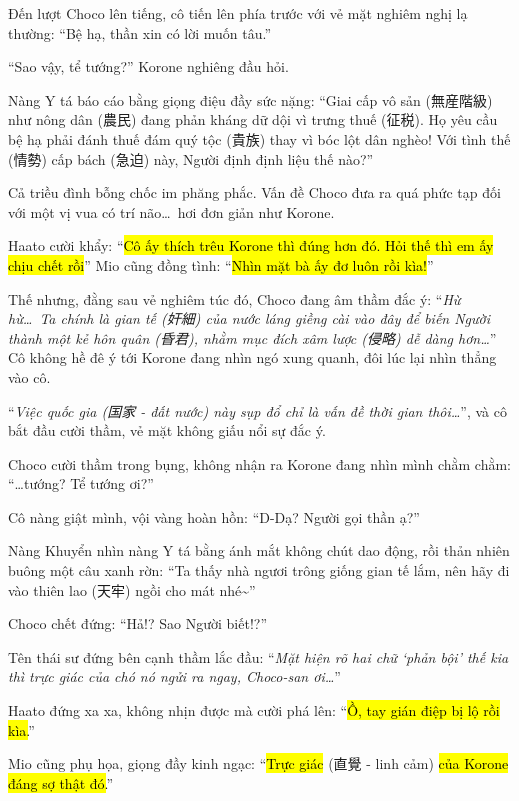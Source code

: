 \documentclass[../main.tex]{subfiles}
\begin{document}
Đến lượt Choco lên tiếng, cô tiến lên phía trước với vẻ mặt nghiêm nghị lạ thường: ``Bệ hạ, thần xin có lời muốn tâu.''

``Sao vậy, tể tướng?'' Korone nghiêng đầu hỏi.

Nàng Y tá báo cáo bằng giọng điệu đầy sức nặng: ``Giai cấp vô sản (無産階級) như nông dân (農民) đang phản kháng dữ dội vì trưng thuế (征税). Họ yêu cầu bệ hạ phải đánh thuế đám quý tộc (貴族) thay vì bóc lột dân nghèo! Với tình thế (情勢) cấp bách (急迫) này, Người định định liệu thế nào?''

Cả triều đình bỗng chốc im phăng phắc. Vấn đề Choco đưa ra quá phức tạp đối với một vị vua có trí não\dots\ hơi đơn giản như Korone.


Haato cười khẩy: ``\hl{Cô ấy thích trêu Korone thì đúng hơn đó. Hỏi thế thì em ấy chịu chết rồi}'' Mio cũng đồng tình: ``\hl{Nhìn mặt bà ấy đơ luôn rồi kìa!}''

Thế nhưng, đằng sau vẻ nghiêm túc đó, Choco đang âm thầm đắc ý: ``\textit{Hừ hừ\dots\ Ta chính là gian tế (奸細) của nước láng giềng cài vào đây để biến Người thành một kẻ hôn quân (昏君), nhằm mục đích xâm lược (侵略) dễ dàng hơn\dots}'' Cô không hề đê ý tới Korone đang nhìn ngó xung quanh, đôi lúc lại nhìn thẳng vào cô.

``\textit{Việc quốc gia (国家 - đất nước) này sụp đổ chỉ là vấn đề thời gian thôi\dots}'', và cô bắt đầu cười thầm, vẻ mặt không giấu nổi sự đắc ý.

Choco cười thầm trong bụng, không nhận ra Korone đang nhìn mình chằm chằm: ``\dots tướng? Tể tướng ơi?''

Cô nàng giật mình, vội vàng hoàn hồn: ``D-Dạ? Người gọi thần ạ?''

Nàng Khuyển nhìn nàng Y tá bằng ánh mắt không chút dao động, rồi thản nhiên buông một câu xanh rờn: ``Ta thấy nhà ngươi trông giống gian tế lắm, nên hãy đi vào thiên lao (天牢) ngồi cho mát nhé\~{}''

Choco chết đứng: ``Hả!? Sao Người biết!?''


Tên thái sư đứng bên cạnh thầm lắc đầu: ``\textit{Mặt hiện rõ hai chữ `phản bội' thế kia thì trực giác của chó nó ngửi ra ngay, Choco-san ơi\dots}''

Haato đứng xa xa, không nhịn được mà cười phá lên: ``\hl{Ồ, tay gián điệp bị lộ rồi kìa.}''

Mio cũng phụ họa, giọng đầy kinh ngạc: ``\hl{Trực giác} (直覺 - linh cảm) \hl{của Korone đáng sợ thật đó.}''
\end{document}
